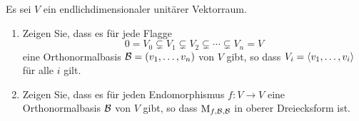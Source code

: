\documentclass[a4paper, 10pt]{scrartcl}
\begin{document}
\begin{question}
  Es sei $V$ ein endlichdimensionaler unitärer Vektorraum.
  \begin{enumerate}
    \item
      Zeigen Sie, dass es für jede Flagge
      \[
                    0
        =           V_0
        \subsetneq  V_1
        \subsetneq  V_2
        \subsetneq  \dotsb
        \subsetneq  V_n
        =           V
      \]
      eine Orthonormalbasis $\mathcal{B} = (v_1, \dotsc, v_n)$ von $V$ gibt, so dass $V_i = \left\langle v_1, \dotsc, v_i \right\rangle$ für alle $i$ gilt.
    \item
      Zeigen Sie, dass es für jeden Endomorphismus $f \colon V \to V$ eine Orthonormalbasis $\mathcal{B}$ von $V$ gibt, so dass $\operatorname{M}_{f, \mathcal{B}, \mathcal{B}}$ in oberer Dreiecksform ist.
  \end{enumerate}
\end{question}
\end{document}
